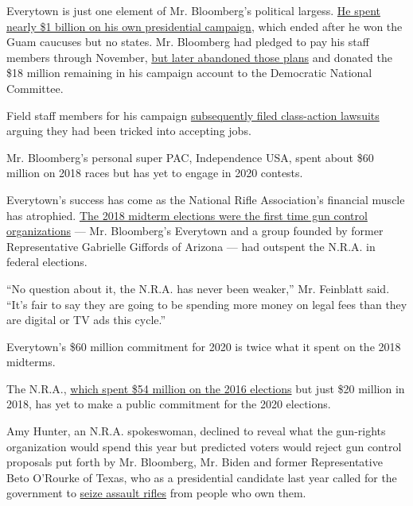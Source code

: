 Everytown is just one element of Mr. Bloomberg's political largess.
\href{https://www.nytimes3xbfgragh.onion/2020/03/20/us/politics/bloomberg-campaign-900-million.html}{He
spent nearly \$1 billion on his own presidential campaign}, which ended
after he won the Guam caucuses but no states. Mr. Bloomberg had pledged
to pay his staff members through November,
\href{https://www.nytimes3xbfgragh.onion/2020/03/20/us/politics/michael-bloomberg-dnc.html}{but
later abandoned those plans} and donated the \$18 million remaining in
his campaign account to the Democratic National Committee.

Field staff members for his campaign
\href{https://www.nytimes3xbfgragh.onion/2020/03/23/us/politics/bloomberg-employee-lawsuit.html}{subsequently
filed class-action lawsuits} arguing they had been tricked into
accepting jobs.

Mr. Bloomberg's personal super PAC, Independence USA, spent about \$60
million on 2018 races but has yet to engage in 2020 contests.

Everytown's success has come as the National Rifle Association's
financial muscle has atrophied.
\href{https://www.wsj.com/articles/democrats-plan-to-pursue-most-aggressive-gun-control-legislation-in-decades-1541791440}{The
2018 midterm elections were the first time gun control organizations}
--- Mr. Bloomberg's Everytown and a group founded by former
Representative Gabrielle Giffords of Arizona --- had outspent the N.R.A.
in federal elections.

``No question about it, the N.R.A. has never been weaker,'' Mr.
Feinblatt said. ``It's fair to say they are going to be spending more
money on legal fees than they are digital or TV ads this cycle.''

Everytown's \$60 million commitment for 2020 is twice what it spent on
the 2018 midterms.

The N.R.A.,
\href{https://www.opensecrets.org/outsidespending/detail.php?cycle=2016\&cmte=National+Rifle+Assn}{which
spent \$54 million on the 2016 elections} but just \$20 million in 2018,
has yet to make a public commitment for the 2020 elections.

Amy Hunter, an N.R.A. spokeswoman, declined to reveal what the
gun-rights organization would spend this year but predicted voters would
reject gun control proposals put forth by Mr. Bloomberg, Mr. Biden and
former Representative Beto O'Rourke of Texas, who as a presidential
candidate last year called for the government to
\href{https://www.nytimes3xbfgragh.onion/2019/10/15/us/politics/beto-guns.html}{seize
assault rifles} from people who own them.

